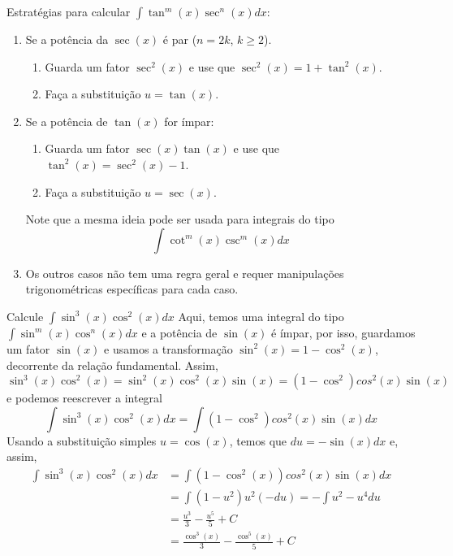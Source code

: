 Estratégias para calcular \(\int \tan^m(x) \sec^n(x)dx\):
\begin{enumerate}
  \item Se a potência da $\sec(x)$ é par ($n=2k$, $k \geq 2$).
        \begin{enumerate}
          \item Guarda um fator $\sec^2(x)$ e use que $\sec^2(x)=1+\tan^2(x)$.
          \item Faça a substituição $u=\tan(x)$.
        \end{enumerate}

  \item Se a potência de $\tan(x)$ for ímpar:
        \begin{enumerate}
          \item Guarda um fator $\sec(x)\tan(x)$ e use que $\tan^2(x)=\sec^2(x)-1$.
          \item Faça a substituição $u=\sec(x)$.
        \end{enumerate}
        Note que a mesma ideia pode ser usada para integrais do tipo
        \[
          \int \cot^m(x) \csc^m(x)dx
        \]

  \item Os outros casos não tem uma regra geral e requer manipulações
        trigonométricas específicas para cada caso.
\end{enumerate}

\begin{example}
  Calcule \(\int \sin^3(x)\cos^2(x)dx\)
  \solution
  Aqui, temos uma integral do tipo
  $\int \sin^m(x) \cos^n(x)dx$ e a potência de $\sin(x)$ é ímpar,
  por isso, guardamos um fator $\sin(x)$ e usamos a transformação
  $\sin^2(x)= 1- \cos^2(x)$, decorrente da relação fundamental. Assim,
  \[
    \sin^3(x)\cos^2(x)= \sin^2(x)\cos^2(x)\sin(x)= (1-\cos^2)cos^2(x)\sin(x)
  \]
  e podemos reescrever a integral
  \[
    \int \sin^3(x)\cos^2(x)dx=\int  (1-\cos^2)cos^2(x)\sin(x) dx
  \]
  Usando a substituição simples $u= \cos(x)$, temos que $du=-\sin(x)dx$ e, assim,
  \begin{align*}
    \int \sin^3(x)\cos^2(x)dx
    & = \int  (1-\cos^2(x))cos^2(x)\sin(x) dx \\
    & = \int (1-u^2)u^2(-du)=- \int u^2-u^4 du \\
    & = \frac{u^3}{3}- \frac{u^5}{5}+C \\
    & = \frac{\cos^3(x)}{3}- \frac{\cos^5(x)}{5}+C
  \end{align*}
\end{example}

